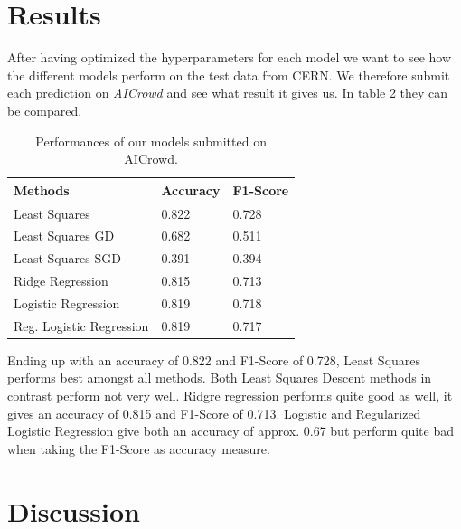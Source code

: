 \documentclass[10pt,conference,compsocconf]{IEEEtran}
\begin{document}
\newpage

\section{Results}


After having optimized the hyperparameters for each model we want to see how the different models perform on the test data from CERN. We therefore submit each prediction on \textit{AICrowd} and see what result it gives us. In table 2 they can be compared.


\begin{table}[h]
	\centering
	\begin{tabular}[c]{|l||l|l|}
		\hline
		Methods&Accuracy&F1-Score\\
	\hline
	Least Squares&0.822&0.728\\
	Least Squares GD&0.682&0.511\\
	Least Squares SGD&0.391&0.394\\		
	Ridge Regression&0.815&0.713\\
	Logistic Regression&0.819&0.718\\
	Reg. Logistic Regression&0.819&0.717\\
	\hline
	\end{tabular}
	\caption{Performances of our models submitted on AICrowd.}
	\label{tab:perform}
\end{table}

Ending up with an accuracy of 0.822 and F1-Score of 0.728, Least Squares performs best amongst all methods. Both Least Squares Descent methods in contrast perform not very well. 
Ridgre regression performs quite good as well, it gives an accuracy of 0.815 and F1-Score of 0.713.
Logistic and Regularized Logistic Regression give both an accuracy of approx. 0.67 but perform quite bad when taking the F1-Score as accuracy measure. 


\section{Discussion}
\end{document}

